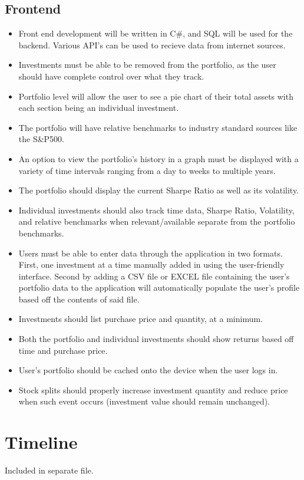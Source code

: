 \documentclass[onecolumn, draftclsnofoot,10pt, compsoc]{IEEEtran}
\begin{document}
\subsection{Frontend}
\begin{itemize}
	\item Front end development will be written in C\#, and SQL will be used for the backend. Various API's can be used to recieve data from internet sources.  
	\item Investments must be able to be removed from the portfolio, as the user should 
		have complete control over what they track. 
	\item Portfolio level will allow the user to see a pie chart of their total assets with each section being an individual investment.
	\item The portfolio will have relative benchmarks to industry standard sources like the S\&P500.
	\item An option to view the portfolio's history in a graph must be displayed with a variety of time intervals ranging from a day to weeks to multiple years.
	\item The portfolio should display the current Sharpe Ratio as well as its volatility.
	\item Individual investments should also track time data, Sharpe Ratio, Volatility, and relative benchmarks when relevant/available separate from the portfolio benchmarks.
	\item Users must be able to enter data through the application in two formats. First, one investment at a time manually added in using the user-friendly interface. Second by
		adding a CSV file or EXCEL file containing the user's portfolio data to the application will automatically populate the user's profile based off the contents of said file.
	\item Investments should list purchase price and quantity, at a minimum.
	\item Both the portfolio and individual investments should show returns based off time and purchase price.
	\item User's portfolio should be cached onto the device when the user logs in.
	\item Stock splits should properly increase investment quantity and reduce price when such event occurs (investment value should remain unchanged).

	
\end{itemize}
\section{Timeline}
Included in separate file.

\end{document}
